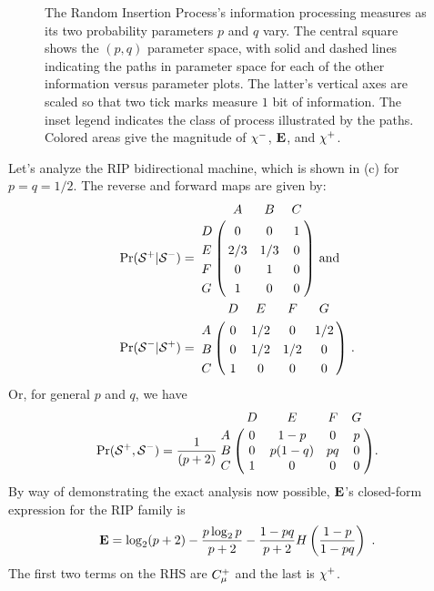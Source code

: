 \begin{figure}[th]
\centering
{}
\caption{The Random Insertion Process's information processing
  measures as its two
  probability parameters $p$ and $q$ vary. The central square
  shows the $(p,q)$ parameter space, with solid and dashed lines
  indicating the paths in parameter space for each of the other
  information versus parameter plots. The latter's vertical axes
  are scaled so that two tick marks measure $1$ bit of information.
  The inset legend indicates the class of process illustrated by
  the paths. Colored areas give the magnitude of
  $\chi^-$, ${\bf E}$, and $\chi^+$.
  }
\label{fig:RIP_info}
\end{figure}

Let's analyze the RIP bidirectional machine, which is shown in 
(c) for $p = q = 1/2$. The reverse and forward maps
are given by:
\begin{align*}
\Pr(\FutureCausalState|\PastCausalState) &=
  \bordermatrix{%
      & A   & B   & C \cr
    D & 0   & 0   & 1 \cr
    E & 2/3 & 1/3 & 0 \cr
    F & 0   & 1   & 0 \cr
    G & 1   & 0   & 0 \cr
  }
  \mathrm{~and}\\
\Pr(\PastCausalState|\FutureCausalState) &=
  \bordermatrix{%
      & D  & E   & F   & G \cr
    A & 0  & 1/2 & 0   & 1/2 \cr
    B & 0  & 1/2 & 1/2 & 0 \cr
    C & 1  & 0   & 0   & 0 \cr
  } ~.
\end{align*}
Or, for general $p$ and $q$, we have
\begin{equation*}
\Pr(\FutureCausalState, \PastCausalState) = \frac{1}{(p+2)}
\bordermatrix{
   & D & E & F & G \cr
 A & 0 & 1-p & 0 & p \cr
 B & 0 & p(1-q) & pq & 0 \cr
 C & 1 & 0 & 0 & 0
} .
\end{equation*}
By way of demonstrating the exact analysis now possible, ${\bf E}$'s closed-form
expression for the RIP family is
\begin{align*}
{\bf E} = \log_2 (p+2) - \frac{p \log_2 p }{p + 2} -
\frac{1-pq}{p + 2} H\left( \frac{1-p}{1-pq}\right) ~.
\end{align*}
The first two terms on the RHS are $C_\mu^{+}$ and the last is $\chi^+$.

